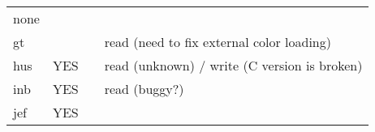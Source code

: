 \begin{longtable}[]{@{}llll@{}}
\begin{minipage}[t]{0.22\columnwidth}
none\strut
\end{minipage}\tabularnewline
\begin{minipage}[t]{0.19\columnwidth}\raggedright
gt\strut
\end{minipage} & \begin{minipage}[t]{0.22\columnwidth}\raggedright
\strut
\end{minipage} & \begin{minipage}[t]{0.25\columnwidth}\raggedright
\strut
\end{minipage} & \begin{minipage}[t]{0.22\columnwidth}\raggedright
read (need to fix external color loading)\strut
\end{minipage}\tabularnewline
\begin{minipage}[t]{0.19\columnwidth}\raggedright
hus\strut
\end{minipage} & \begin{minipage}[t]{0.22\columnwidth}\raggedright
YES\strut
\end{minipage} & \begin{minipage}[t]{0.25\columnwidth}\raggedright
\strut
\end{minipage} & \begin{minipage}[t]{0.22\columnwidth}\raggedright
read (unknown) / write (C version is broken)\strut
\end{minipage}\tabularnewline
\begin{minipage}[t]{0.19\columnwidth}\raggedright
inb\strut
\end{minipage} & \begin{minipage}[t]{0.22\columnwidth}\raggedright
YES\strut
\end{minipage} & \begin{minipage}[t]{0.25\columnwidth}\raggedright
\strut
\end{minipage} & \begin{minipage}[t]{0.22\columnwidth}\raggedright
read (buggy?)\strut
\end{minipage}\tabularnewline
\begin{minipage}[t]{0.19\columnwidth}\raggedright
jef\strut
\end{minipage} & \begin{minipage}[t]{0.22\columnwidth}\raggedright
YES\strut
\end{minipage} & \begin{minipage}[t]{0.25\columnwidth}\raggedright
\strut
\end{minipage} & \begin{minipage}[t]{0.22\columnwidth}\raggedright

\end{minipage}
\end{longtable}

